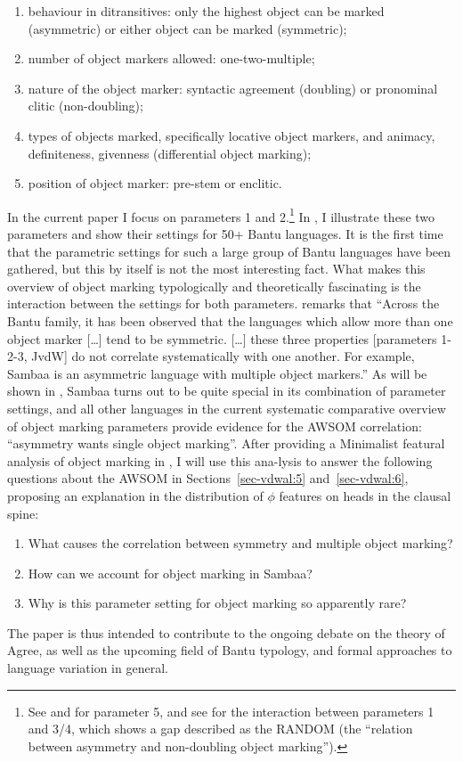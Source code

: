 \documentclass[output=paper
,modfonts
,nonflat]{langsci/langscibook}
\begin{document}
\begin{enumerate}
\item behaviour in ditransitives: only the highest object can be marked (asymmetric) or either object can be marked (symmetric); 
\item number of object markers allowed: one-two-multiple;
\item nature of the object marker: syntactic agreement (doubling) or pronominal clitic (non-doubling);
\item types of objects marked, specifically locative object markers, and animacy, definiteness, givenness (differential object marking);
\item position of object marker: pre-stem or enclitic.
\end{enumerate}
In the current paper I focus on parameters 1 and 2.\footnote{See \citet{Beaudoin-Lietz_et_al2004} and \citet{Marlo2015} for parameter 5, and see \citet{Van_der_Wal2017b} for the interaction between parameters 1 and 3/4, which shows a gap described as the RANDOM (the ``relation between asymmetry and non-doubling object marking'').} 
In , I illustrate these two parameters and show their settings for 50+ Bantu languages. It is the first time that the parametric settings for such a large group of Bantu languages have been gathered, but this by itself is not the most interesting fact. What makes this overview of object marking typologically and theoretically fascinating is the interaction between the settings for both parameters. \citet[78]{Riedel2009} remarks that “Across the Bantu family, it has been observed that the languages which allow more than one object marker […] tend to be symmetric. […] these three properties [parameters 1-2-3, JvdW] do not correlate systematically with one another. For example, Sambaa is an asymmetric language with multiple object markers.” As will be shown in , Sambaa turns out to be quite special in its combination of parameter settings, and all other languages in the current systematic comparative overview of object marking parameters provide evidence for the AWSOM correlation: ``asymmetry wants single object marking''. After providing a Minimalist featural analysis of object marking in , I will use this ana-lysis to answer the following questions about the AWSOM in Sections~\ref{sec-vdwal:5} and~\ref{sec-vdwal:6}, proposing an explanation in the distribution of $\phi$ features on heads in the clausal spine:

\begin{enumerate}
\item What causes the correlation between symmetry and multiple object marking?
\item How can we account for object marking in Sambaa?
\item Why is this parameter setting for object marking so apparently rare?
\end{enumerate}
The paper is thus intended to contribute to the ongoing debate on the theory of Agree, as well as the upcoming field of Bantu typology, and formal approaches to language variation in general.
\end{document}
